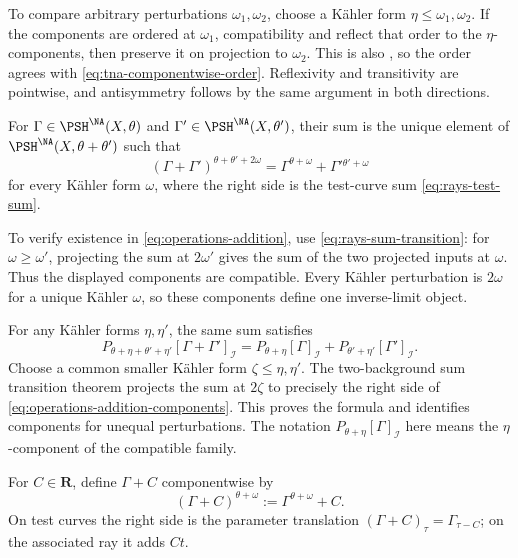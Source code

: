 To compare arbitrary perturbations $\omega_1,\omega_2$, choose
a K\"ahler form $\eta\leq\omega_1,\omega_2$.
If the components are ordered at $\omega_1$, compatibility and
 reflect that order to the
$\eta$-components, then preserve it on projection to $\omega_2$.
This is also , so the order agrees with
\eqref{eq:tna-componentwise-order}.
Reflexivity and transitivity are pointwise, and antisymmetry
follows by the same argument in both directions.

\begin{definition}[Addition]
\label{def:operations-addition}
For
$\Gamma\in\PSH^{\NA}(X,\theta)$ and
$\Gamma'\in\PSH^{\NA}(X,\theta')$, their sum is the unique element of
$\PSH^{\NA}(X,\theta+\theta')$ such that
\[
 (\Gamma+\Gamma')^{\theta+\theta'+2\omega}
 =\Gamma^{\theta+\omega}+\Gamma'{}^{\theta'+\omega}
\tag{54.2}\label{eq:operations-addition}
\]
for every K\"ahler form $\omega$, where the right side is the
test-curve sum \eqref{eq:rays-test-sum}.
\end{definition}

To verify existence in \eqref{eq:operations-addition}, use
\eqref{eq:rays-sum-transition}: for $\omega\geq\omega'$, projecting
the sum at $2\omega'$ gives the sum of the two projected inputs at
$\omega$.  Thus the displayed components are compatible.
Every K\"ahler perturbation is $2\omega$ for a unique K\"ahler $\omega$,
so these components define one inverse-limit object.

For any K\"ahler forms $\eta,\eta'$, the same sum satisfies
\[
 P_{\theta+\eta+\theta'+\eta'}
       [\Gamma+\Gamma']_{\mathcal I}
 =
 P_{\theta+\eta}[\Gamma]_{\mathcal I}
 +P_{\theta'+\eta'}[\Gamma']_{\mathcal I}.
\tag{54.3}\label{eq:operations-addition-components}
\]
Choose a common smaller K\"ahler form $\zeta\leq\eta,\eta'$.
The two-background sum transition theorem
\cite[Lemma~9.4.3]{XiaBook} projects the sum at $2\zeta$ to precisely
the right side of \eqref{eq:operations-addition-components}.
This proves the formula and identifies components for unequal
perturbations.  The notation $P_{\theta+\eta}[\Gamma]_{\mathcal I}$
here means the $\eta$-component of the compatible family.

\begin{definition}[Translation]
\label{def:operations-translation}
For $C\in\mathbf R$, define $\Gamma+C$ componentwise by
\[
             (\Gamma+C)^{\theta+\omega}
             :=\Gamma^{\theta+\omega}+C.
\tag{54.4}\label{eq:operations-translation}
\]
On test curves the right side is the parameter translation
$(\Gamma+C)_\tau=\Gamma_{\tau-C}$; on the associated ray it adds
$Ct$.
\end{definition}


